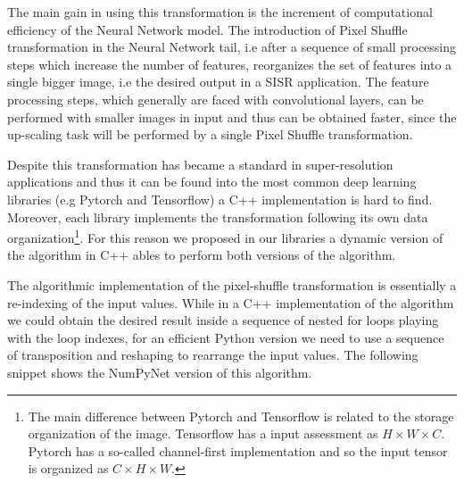 \documentclass{standalone}
\begin{document}
The main gain in using this transformation is the increment of computational efficiency of the Neural Network model.
The introduction of Pixel Shuffle transformation in the Neural Network tail, i.e after a sequence of small processing steps which increase the number of features, reorganizes the set of features into a single bigger image, i.e the desired output in a SISR application.
The feature processing steps, which generally are faced with convolutional layers, can be performed with smaller images in input and thus can be obtained faster, since the up-scaling task will be performed by a single Pixel Shuffle transformation.

Despite this transformation has became a standard in super-resolution applications and thus it can be found into the most common deep learning libraries (e.g \textsf{Pytorch} and \textsf{Tensorflow}) a \textsf{C++} implementation is hard to find.
Moreover, each library implements the transformation following its own data organization\footnote{
  The main difference between \textsf{Pytorch} and \textsf{Tensorflow} is related to the storage organization of the image.
  \textsf{Tensorflow} has a  input assessment as $H \times W \times C$.
  \textsf{Pytorch} has a so-called channel-first implementation and so the input tensor is organized as $C \times H \times W$.
}.
For this reason we proposed in our libraries a dynamic version of the algorithm in \textsf{C++} ables to perform both versions of the algorithm.

The algorithmic implementation of the pixel-shuffle transformation is essentially a re-indexing of the input values.
While in a \textsf{C++} implementation of the algorithm we could obtain the desired result inside a sequence of nested for loops playing with the loop indexes, for an efficient \textsf{Python} version we need to use a sequence of transposition and reshaping to rearrange the input values.
The following snippet shows the \textsf{NumPyNet} version of this algorithm.
\end{document}
